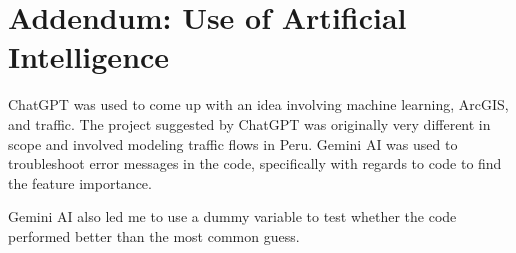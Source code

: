 \documentclass[12pt]{article}
\begin{document}
\appendix
\section{Addendum: Use of Artificial Intelligence}

ChatGPT was used to come up with an idea involving machine learning, ArcGIS, and traffic. The project suggested by ChatGPT
was originally very different in scope and involved modeling traffic flows in Peru. 
Gemini AI was used to troubleshoot error messages in the code, specifically with regards to code to find the feature importance.

Gemini AI also led me to use a dummy variable to test whether the code performed better than the most common guess.



\end{document}
